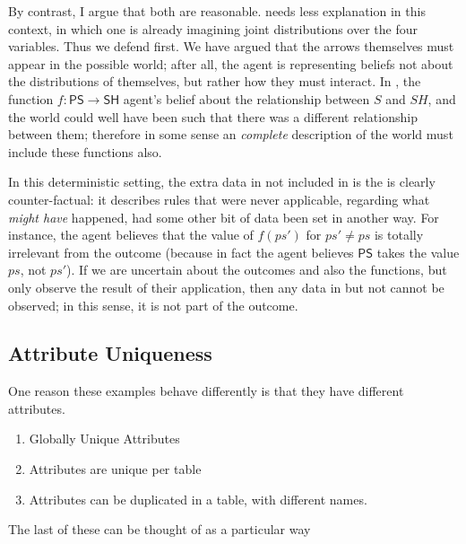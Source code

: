 \documentclass{article}
\theoremstyle{definition}
\theoremstyle{remark}
\newcommand{\var}[1]{\mathsf{#1}}
\begin{document}
\begin{example}
    By contrast, I argue that both  are reasonable.  needs less explanation in this context, in which one is already imagining joint distributions over the four variables. Thus we defend  first.
    We have argued that the arrows themselves must appear in the possible world; after all, the agent is representing beliefs not about the distributions of themselves, but rather how they must interact.
    In , the function $f: \var{PS} \to \var{SH}$ agent's belief about the relationship between $S$ and $SH$, and the world could well have been such that there was a different relationship between them; therefore in some sense an \emph{complete} description of the world must include these functions also. 
         
    In this deterministic setting, the extra data in  not included in  is the is clearly counter-factual: it describes rules that were never applicable, regarding what \emph{might have} happened, had some other bit of data been set in another way. For instance, the agent believes that the value of $f(ps')$ for $ps' \neq ps$ is totally irrelevant from the outcome (because in fact the agent believes $\var{PS}$ takes the value $ps$, not $ps'$). 
    If we are uncertain about the outcomes and also the functions, but only observe the result of their application, then any data in  but not  cannot be observed; in this sense, it is not part of the outcome. 
\end{example}

\subsection{Attribute Uniqueness}

One reason these examples behave differently is that they have different attributes.

\begin{enumerate}[nosep]
	\item Globally Unique Attributes
	\item Attributes are unique per table
	\item Attributes can be duplicated in a table, with different names.
\end{enumerate}

The last of these can be thought of as a particular way 
\end{document}
